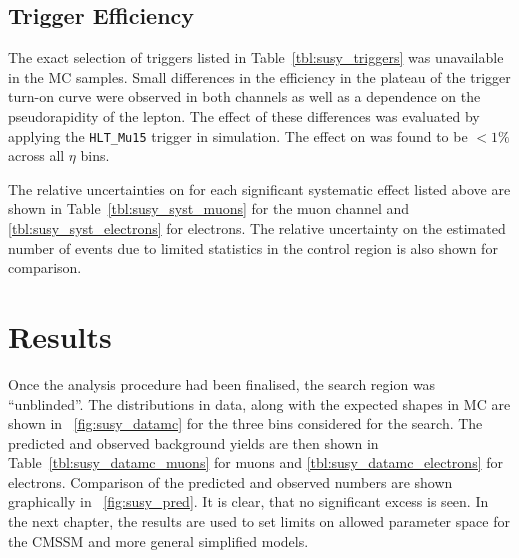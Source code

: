 \subsection{Trigger Efficiency}
The exact selection of triggers listed in Table~\ref{tbl:susy_triggers} was
unavailable in the \ac{MC} samples. Small differences in the efficiency in
the plateau of the trigger turn-on curve were observed in both channels as well
as a dependence on the pseudorapidity of the lepton. The effect of these
differences was evaluated by applying the \texttt{HLT\_Mu15} trigger in
simulation. The effect on \RCS was found to be $<1\%$ across all $\eta$ bins.


The relative uncertainties on \RCS for each significant systematic effect listed
above are shown in Table~\ref{tbl:susy_syst_muons} for the muon channel and
\ref{tbl:susy_syst_electrons} for electrons. The relative uncertainty on the
estimated number of events due to limited statistics in the control region is
also shown for comparison.




\section{Results}
Once the analysis procedure had been finalised, the search region was
``unblinded''. The \LP distributions in data, along with the expected shapes in
\ac{MC} are shown in \fig~\ref{fig:susy_datamc} for the three \STlep bins
considered for the search. The predicted and observed background yields are then
shown in Table~\ref{tbl:susy_datamc_muons} for muons and
\ref{tbl:susy_datamc_electrons} for electrons. Comparison of the predicted and
observed numbers are shown graphically in \fig~\ref{fig:susy_pred}. It is
clear, that no significant excess is seen. In the next chapter, the results are
used to set limits on allowed parameter space for the \ac{CMSSM} and more
general simplified models.

